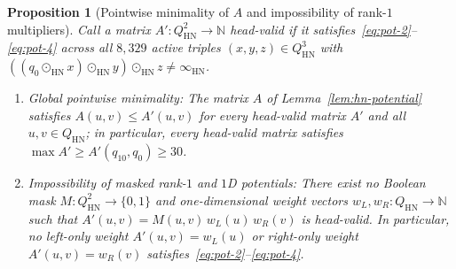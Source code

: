 \documentclass[11pt,reqno]{amsart}
\numberwithin{equation}{section}
\theoremstyle{plain}
\newtheorem{proposition}[theorem]{Proposition}
\theoremstyle{definition}
\theoremstyle{remark}
\newcommand{\HN}{\mathrm{HN}}
\begin{document}
\begin{proposition}[Pointwise minimality of $A$ and impossibility of rank-$1$ multipliers]\label{prop:hna-minimality}
Call a matrix $A' \colon Q_{\HN}^2 \to \mathbb{N}$ \emph{head-valid} if it satisfies~\eqref{eq:pot-2}--\eqref{eq:pot-4} across all $8{,}329$ active triples $(x, y, z) \in Q_{\HN}^3$ with $((q_0 \odot_{\HN} x) \odot_{\HN} y) \odot_{\HN} z \neq \infty_{\HN}$.
\begin{enumerate}[label=(\roman*),leftmargin=2.2em]
  \item \emph{Global pointwise minimality:} The matrix $A$ of Lemma~\ref{lem:hn-potential} satisfies $A(u, v) \le A'(u, v)$ for every head-valid matrix $A'$ and all $u, v \in Q_{\HN}$; in particular, every head-valid matrix satisfies $\max A' \ge A'(q_{10}, q_0) \ge 30$.
  \item \emph{Impossibility of masked rank-$1$ and $1$D potentials:} There exist no Boolean mask $M \colon Q_{\HN}^2 \to \{0, 1\}$ and one-dimensional weight vectors $w_L, w_R \colon Q_{\HN} \to \mathbb{N}$ such that $A'(u, v) = M(u, v)\,w_L(u)\,w_R(v)$ is head-valid. In particular, no left-only weight $A'(u, v) = w_L(u)$ or right-only weight $A'(u, v) = w_R(v)$ satisfies~\eqref{eq:pot-2}--\eqref{eq:pot-4}.
\end{enumerate}
\end{proposition}
\end{document}
